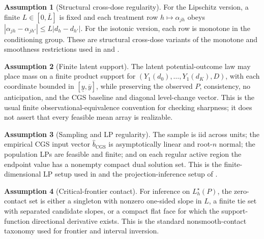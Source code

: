 \documentclass[11pt]{article}
\theoremstyle{definition}
\newtheorem{assumption}{Assumption}
\theoremstyle{plain}
\theoremstyle{remark}
\begin{document}
\begin{assumption}[Structural cross-dose regularity]\label{ass:regularity}
For the Lipschitz version, a finite \(L\in[0,\bar L]\) is fixed and each
treatment row \(h\mapsto\alpha_{j h}\) obeys
\(|\alpha_{j h}-\alpha_{j h'}|\le L|d_h-d_{h'}|\).  For the isotonic version,
each row is monotone in the conditioning group.  These are structural
cross-dose variants of the monotone and smoothness restrictions used in
\citet{ManskiPepper2000} and \citet{ArmstrongKolesar2018}.
\end{assumption}

\begin{assumption}[Finite latent support]\label{ass:completion}
The latent potential-outcome law may place mass on a finite product support
for \((Y_1(d_0),\ldots,Y_1(d_K),D)\), with each coordinate bounded in
\([\underline y,\overline y]\), while preserving the observed \(P\), consistency,
no anticipation, and the CGS baseline and diagonal level-change vector.  This is the usual
finite observational-equivalence convention for checking sharpness; it does
not assert that every feasible mean array is realizable.
\end{assumption}

\begin{assumption}[Sampling and LP regularity]\label{ass:sampling-lp}
The sample is iid across units; the empirical CGS input vector
\(\widehat b_{\mathrm{CGS}}\) is asymptotically linear and root-\(n\)
normal; the population LPs are feasible and finite; and on each regular
active region the endpoint value has a nonempty compact dual solution set.
This is the finite-dimensional LP setup used in \citet{Voronin2025} and the
projection-inference setup of \citet{KaidoMolinariStoye2019}.
\end{assumption}

\begin{assumption}[Critical-frontier contact]\label{ass:frontier-contact}
For inference on \(L_h^\star(P)\), the zero-contact set is either a singleton
with nonzero one-sided slope in \(L\), a finite tie set with separated
candidate slopes, or a compact flat face for which the support-function
directional derivative exists.  This is the standard nonsmooth-contact
taxonomy used for frontier and interval inversion.
\end{assumption}
\end{document}
